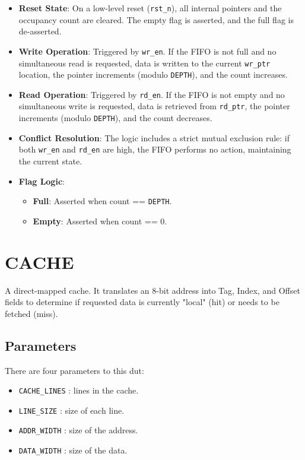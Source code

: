 \begin{itemize}

    \item \textbf{Reset State}: On a low-level reset (\texttt{rst\_n}), all internal pointers and the occupancy count are cleared. The empty flag is asserted, and the full flag is de-asserted.

    \item \textbf{Write Operation}: Triggered by \texttt{wr\_en}. If the FIFO is not full and no simultaneous read is requested, data is written to the current \texttt{wr\_ptr} location, the pointer increments (modulo \texttt{DEPTH}), and the count increases.
    
    \item \textbf{Read Operation}: Triggered by \texttt{rd\_en}. If the FIFO is not empty and no simultaneous write is requested, data is retrieved from \texttt{rd\_ptr}, the pointer increments (modulo \texttt{DEPTH}), and the count decreases.

    \item \textbf{Conflict Resolution}: The logic includes a strict mutual exclusion rule: if both \texttt{wr\_en} and \texttt{rd\_en} are high, the FIFO performs no action, maintaining the current state.

    \item \textbf{Flag Logic}:
    \begin{itemize}
        \item \textbf{Full}: Asserted when count == \texttt{DEPTH}.
        \item \textbf{Empty}: Asserted when count == 0.
    \end{itemize}

\end{itemize}

\section{CACHE}

A direct-mapped cache.
It translates an 8-bit address into Tag, Index, and Offset fields to determine if requested data is currently "local" (hit) or needs to be fetched (miss).

\subsection{Parameters}

There are four parameters to this dut:

\begin{itemize}
    \item \texttt{CACHE\_LINES} : lines in the cache.
    \item \texttt{LINE\_SIZE} : size of each line.
    \item \texttt{ADDR\_WIDTH} : size of the address.
    \item \texttt{DATA\_WIDTH} : size of the data.
\end{itemize}

